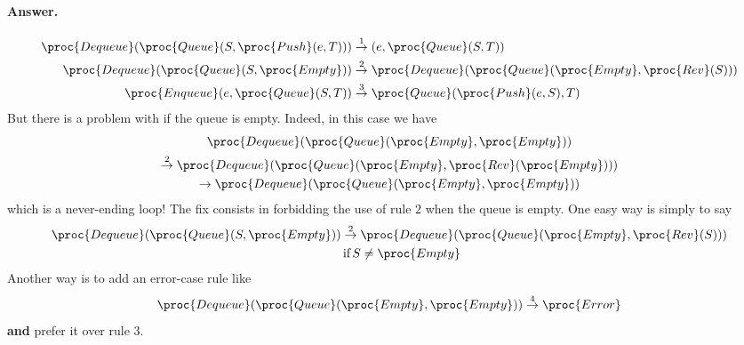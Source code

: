 \paragraph{Answer.}
\begin{align*}
\proc{Dequeue}(\proc{Queue}(S,\proc{Push}(e,T)))
&\stackrel{1}{\rightarrow} (e,\proc{Queue}(S,T))\\
\proc{Dequeue}(\proc{Queue}(S,\proc{Empty}))
&\stackrel{2}{\rightarrow}
\proc{Dequeue}(\proc{Queue}(\proc{Empty}, \proc{Rev}(S)))\\
\proc{Enqueue}(e,\proc{Queue}(S,T)) 
&\stackrel{3}{\rightarrow}
  \proc{Queue}(\proc{Push}(e,S),T)
\end{align*}
\noindent But there is a problem with  if the queue is
empty. Indeed, in this case we have
\begin{multline*}
\proc{Dequeue}(\proc{Queue}(\proc{Empty}, \proc{Empty}))\\
\stackrel{2}{\rightarrow} \proc{Dequeue}(\proc{Queue}(\proc{Empty},
\proc{Rev}(\proc{Empty})))\\
\rightarrow \proc{Dequeue}(\proc{Queue}(\proc{Empty}, \proc{Empty}))
\end{multline*}
\noindent which is a never-ending loop! The fix consists in forbidding
the use of rule \(2\) when the queue is empty. One easy way is simply
to say
\begin{gather*}
\proc{Dequeue}(\proc{Queue}(S,\proc{Empty})) \stackrel{2}{\rightarrow}
\proc{Dequeue}(\proc{Queue}(\proc{Empty}, \proc{Rev}(S)))\\
\qquad \text{if} \, S \neq \proc{Empty}
\end{gather*}
\noindent Another way is to add an error-case rule like
\[
\proc{Dequeue}(\proc{Queue}(\proc{Empty},\proc{Empty})) 
\stackrel{4}{\rightarrow} \proc{Error}
\]
\noindent \textbf{and} prefer it over rule \(3\).
